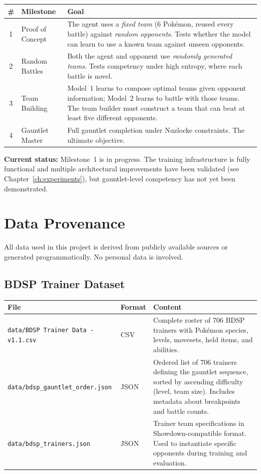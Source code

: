 \begin{center}
\small
\begin{tabularx}{\textwidth}{c l X}
  \toprule
  \textbf{\#} & \textbf{Milestone} & \textbf{Goal} \\
  \midrule
  1 & Proof of Concept &
    The agent uses a \emph{fixed team} (6 Pok\'{e}mon, reused every battle)
    against \emph{random opponents}.  Tests whether the model can learn to
    use a known team against unseen opponents. \\
  2 & Random Battles &
    Both the agent and opponent use \emph{randomly generated teams}.  Tests
    competency under high entropy, where each battle is novel. \\
  3 & Team Building &
    Model~1 learns to compose optimal teams given opponent information;
    Model~2 learns to battle with those teams.  The team builder must
    construct a team that can beat at least five different opponents. \\
  4 & Gauntlet Master &
    Full gauntlet completion under Nuzlocke constraints.  The ultimate
    objective. \\
  \bottomrule
\end{tabularx}
\end{center}

\textbf{Current status:} Milestone~1 is in progress.  The training
infrastructure is fully functional and multiple architectural improvements have
been validated (see Chapter~\ref{ch:experiments}), but gauntlet-level
competency has not yet been demonstrated.

\section{Data Provenance}

All data used in this project is derived from publicly available sources or
generated programmatically.  No personal data is involved.

\subsection{BDSP Trainer Dataset}

\begin{center}
\small
\begin{tabularx}{\textwidth}{l l X}
  \toprule
  \textbf{File} & \textbf{Format} & \textbf{Content} \\
  \midrule
  \texttt{data/BDSP Trainer Data - v1.1.csv} & CSV &
    Complete roster of 706 BDSP trainers with Pok\'{e}mon species, levels,
    movesets, held items, and abilities. \\
  \texttt{data/bdsp\_gauntlet\_order.json} & JSON &
    Ordered list of 706 trainers defining the gauntlet sequence, sorted by
    ascending difficulty (level, team size).  Includes metadata about
    breakpoints and battle counts. \\
  \texttt{data/bdsp\_trainers.json} & JSON &
    Trainer team specifications in Showdown-compatible format.  Used to
    instantiate specific opponents during training and evaluation. \\
  \bottomrule
\end{tabularx}
\end{center}

